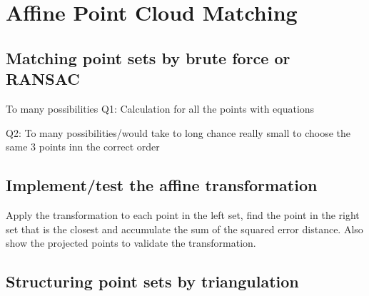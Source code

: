 \chapter{Affine Point Cloud Matching}


\section{Matching point sets by brute force or RANSAC}

To many possibilities
Q1: Calculation for all the points with equations

Q2: To many possibilities/would take to long chance really small to choose the same 3 points inn the correct order

\section{Implement/test the affine transformation}

Apply the transformation to each point in the left set, find the point in the right set that is the closest and accumulate the sum of the squared error distance. Also show the projected points to validate the transformation.

\section{Structuring point sets by triangulation}